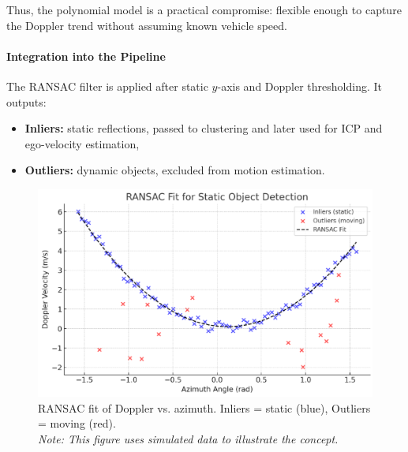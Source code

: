Thus, the polynomial model is a practical compromise: flexible enough to capture the Doppler trend without assuming known vehicle speed.

\paragraph{Integration into the Pipeline}
The RANSAC filter is applied after static $y$-axis and Doppler thresholding.  
It outputs:
\begin{itemize}
    \item \textbf{Inliers:} static reflections, passed to clustering and later used for ICP and ego-velocity estimation,
    \item \textbf{Outliers:} dynamic objects, excluded from motion estimation.
\end{itemize}

\begin{figure}[!htbp]
    \centering
    \includegraphics[width=1.0\linewidth]{images/RANSAC.png}
    \caption{RANSAC fit of Doppler vs. azimuth. Inliers = static (blue), Outliers = moving (red).\\
    \textit{Note: This figure uses simulated data to illustrate the concept.}}
    \label{fig:ransac_simulated_static_dynamic}
\end{figure}

